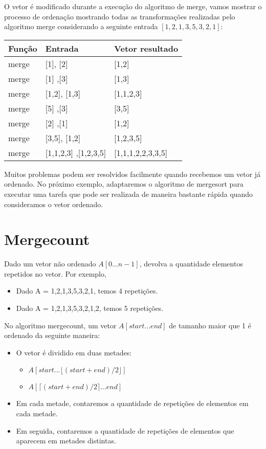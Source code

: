 O vetor é modificado durante a execução do algoritmo de merge, vamos mostrar o processo de ordenação mostrando todas as transformações realizadas pelo algoritmo merge considerando a seguinte entrada  $[1,2,1,3,5,3,2,1]$:

\begin{center}
\begin{tabular}{l|l|l}
Função    & Entrada & Vetor resultado\\
\hline 
merge     &  [1], [2] & [1,2] \\
merge     &  [1] ,[3] & [1,3] \\
merge     &  [1,2], [1,3] & [1,1,2,3] \\
merge     &  [5] ,[3] & [3,5] \\
merge     &  [2] ,[1] & [1,2] \\
merge     &  [3,5], [1,2] & [1,2,3,5] \\
merge     &  [1,1,2,3] ,[1,2,3,5] & [1,1,1,2,2,3,3,5] \\
\end{tabular}
\end{center}


Muitos problemas podem ser resolvidos facilmente quando recebemos um vetor já ordenado. No próximo exemplo, adaptaremos o algoritmo de mergesort para executar uma tarefa que pode ser realizada de maneira bastante rápida quando consideramos o vetor ordenado.


\section{Mergecount}

\begin{exemplo}
Dado um vetor não ordenado $A[0 \ldots n-1]$, devolva a quantidade elementos repetidos no vetor. Por exemplo,

\begin{itemize}
\item Dado A = {1,2,1,3,5,3,2,1}, temos 4 repetições.
\item Dado A = {1,2,1,3,5,3,2,1,2}, temos 5 repetições.
\end{itemize}

\end{exemplo}


No algoritmo mergecount, um  vetor $A[start \ldots end]$ de tamanho maior que 1 é ordenado da seguinte maneira:

\begin{itemize}
    \item O vetor é dividido em duas metades:
    \begin{itemize}
    \item $A[start \ldots \lfloor (start+end)/2 \rfloor ]$ 
    \item $A[ \lceil (start+end)/2 \rceil \ldots end ]$
    \end{itemize}
    \item Em cada metade, contaremos a quantidade de repetições de elementos em cada metade.
    \item Em seguida, contaremos a quantidade de repetições de elementos que aparecem em metades distintas.
\end{itemize}


